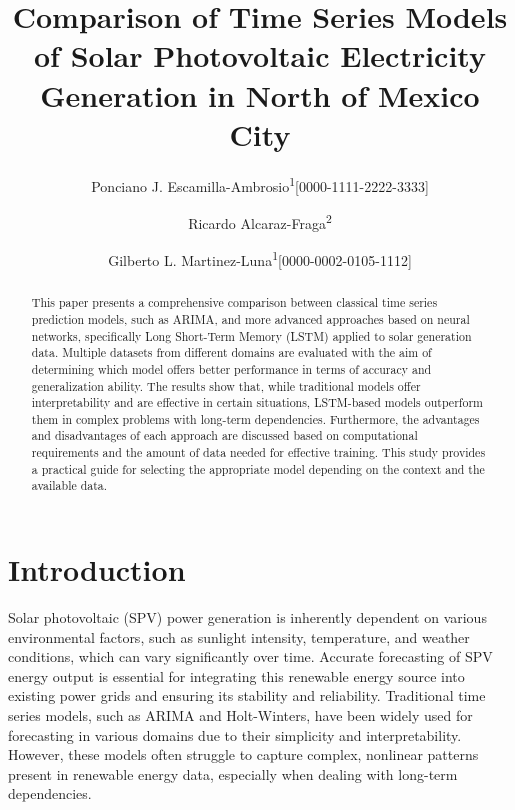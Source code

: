 \documentclass[a4paper,12pt]{article}
\begin{document}
\title{Comparison of Time Series Models of Solar Photovoltaic Electricity Generation in North of Mexico City}
\author{Ponciano J. Escamilla-Ambrosio\textsuperscript{1}[0000-1111-2222-3333]}
\author{Ricardo Alcaraz-Fraga\textsuperscript{2}}
\author{Gilberto L. Martinez-Luna\textsuperscript{1}[0000-0002-0105-1112]}


\maketitle

\begin{abstract}
This paper presents a comprehensive comparison between classical time series prediction models, such as ARIMA, and more advanced approaches based on neural networks, specifically Long Short-Term Memory (LSTM) applied to solar generation data. Multiple datasets from different domains are evaluated with the aim of determining which model offers better performance in terms of accuracy and generalization ability. The results show that, while traditional models offer interpretability and are effective in certain situations, LSTM-based models outperform them in complex problems with long-term dependencies. Furthermore, the advantages and disadvantages of each approach are discussed based on computational requirements and the amount of data needed for effective training. This study provides a practical guide for selecting the appropriate model depending on the context and the available data.
\end{abstract}

\section{Introduction}
Solar photovoltaic (SPV) power generation is inherently dependent on various environmental factors, such as sunlight intensity, temperature, and weather conditions, which can vary significantly over time. Accurate forecasting of SPV energy output is essential for integrating this renewable energy source into existing power grids and ensuring its stability and reliability. Traditional time series models, such as ARIMA and Holt-Winters, have been widely used for forecasting in various domains due to their simplicity and interpretability. However, these models often struggle to capture complex, nonlinear patterns present in renewable energy data, especially when dealing with long-term dependencies.
\end{document}
